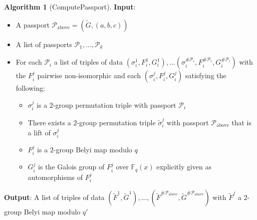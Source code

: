 \documentclass{dcthesis}
\newcommand{\wt}[1]{\widetilde{#1}}
\newcommand{\FF}{\mathbb{F}}
\numberwithin{equation}{section}
\theoremstyle{definition}
\newtheorem{alg}[equation]{Algorithm}
\theoremstyle{remark}
\begin{document}
{{{\begin{alg}[ComputePassport]
      \textbf{Input}:
      \begin{itemize}
        \item
          A passport
          $\mathcal{P}_{\text{above}} =
          (\wt{G},(a,b,c))$
        \item
          A list of passports
          $\mathcal{P}_1,
          \dots,
          \mathcal{P}_k$
        \item
          For each
          $\mathcal{P}_i$
          a list of triples of data
          $(\sigma_i^1,F_i^1,G_i^1),
          \dots
          (\sigma_i^{\#\mathcal{P}_i},
          F_i^{\#\mathcal{P}_i},
          G_i^{\#\mathcal{P}_i})$
          with the $F_i^j$
          pairwise non-isomorphic
          and
          each
          $(\sigma_i^j,F_i^j,G_i^j)$
          satisfying the following:
          \begin{itemize}
            \item
              $\sigma_i^j$ is a $2$-group
              permutation triple with passport
              $\mathcal{P}_i$
            \item
              There exists
              a $2$-group
              permutation triple
              $\wt{\sigma}_i^j$
              with passport
              $\mathcal{P}_\text{above}$
              that is a lift
              of $\sigma_i^j$
            \item
              $F_i^j$ is a $2$-group Belyi map
              modulo $q$
            \item
              $G_i^j$ is the Galois group of
              $F_i^j$ over $\FF_q(x)$
              explicitly given as
              automorphisms of $F_i^j$
          \end{itemize}
      \end{itemize}
      \textbf{Output}:
      A list of triples of data
      $(\wt{F}^1,\wt{G}^1),
      \dots,
      (\wt{F}^{\#\mathcal{P}_\text{above}},
      \wt{G}^{\#\mathcal{P}_\text{above}})$
      with
      $\wt{F}^j$
      a $2$-group Belyi map modulo $q'$

\end{alg}}}}
\end{document}
